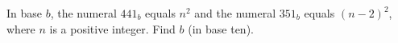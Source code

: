 In base $b$, the numeral $441_b$ equals $n^2$ and the numeral $351_b$ equals $(n-2)^2$, where $n$ is a positive integer. Find $b$ (in base ten).
